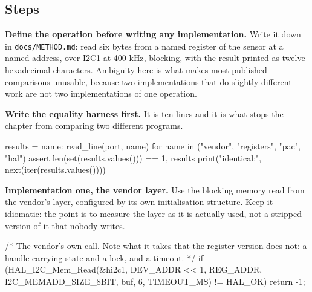 \subsection*{Steps}

\begin{steps}
\item \textbf{Define the operation before writing any implementation.} Write it
down in \texttt{docs/METHOD.md}: read six bytes from a named register of the
sensor at a named address, over I2C1 at 400 kHz, blocking, with the result
printed as twelve hexadecimal characters. Ambiguity here is what makes most
published comparisons unusable, because two implementations that do slightly
different work are not two implementations of one operation.

\item \textbf{Write the equality harness first.} It is ten lines and it is what
stops the chapter from comparing two different programs.
\begin{pycode}
results = {name: read_line(port, name) for name in
           ("vendor", "registers", "pac", "hal")}
assert len(set(results.values())) == 1, results
print("identical:", next(iter(results.values())))
\end{pycode}

\item \textbf{Implementation one, the vendor layer.} Use the blocking memory
read from the vendor's layer, configured by its own initialisation structure.
Keep it idiomatic: the point is to measure the layer as it is actually used, not
a stripped version of it that nobody writes.
\begin{ccode}
/* The vendor's own call. Note what it takes that the register version
   does not: a handle carrying state and a lock, and a timeout. */
if (HAL_I2C_Mem_Read(&hi2c1, DEV_ADDR << 1, REG_ADDR,
                     I2C_MEMADD_SIZE_8BIT, buf, 6, TIMEOUT_MS) != HAL_OK) {
    return -1;
}
\end{ccode}


\end{steps}
